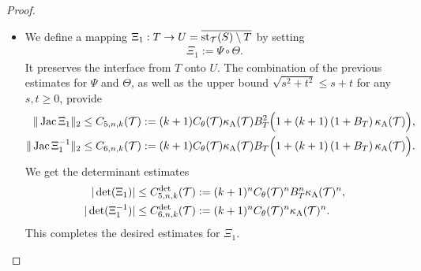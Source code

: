 \documentclass[10pt,a4paper]{article}
\begin{document}
\begin{proof}
\begin{itemize}
        
        
        
        \item 
        We define a mapping $ \Xi_{1} : T \rightarrow U = \overline{\operatorname{st}_{{\mathcal T}}(S) \setminus T}$ by setting 
        \begin{align*}
            \Xi_{1} := \Psi \circ \Theta.
        \end{align*}
        It preserves the interface from $T$ onto $U$. 
        The combination of the previous estimates for $\Psi$ and $\Theta$,
        as well as the upper bound $\sqrt{s^2+t^2} \leq s + t$ for any $s,t \geq 0$,
        provide 
        \begin{align*}
            \|  \operatorname{{\rm Jac}} \Xi_{1}  \|_{2}
            &\leq 
            C_{5,n,k}({\mathcal T})
            :=
            (k+1) 
            C_\theta({\mathcal T})
            \kappa_{\rm A}({\mathcal T})
            B_{T}^{2}
            \Big( 
                1 
                + 
                (k+1) 
                \left( 1 + B_{T} \right)
                \kappa_{\rm A}({\mathcal T})
            \Big)            
            ,
            \\
            \|  \operatorname{{\rm Jac}} \Xi_{1}^{-1}  \|_{2}
            &\leq  
            C_{6,n,k}({\mathcal T})
            :=
            (k+1) 
            C_\theta({\mathcal T})
            \kappa_{\rm A}({\mathcal T})
            B_{T}
            \Big( 
                1 
                + 
                (k+1) 
                \left( 1 + B_{T} \right)
                \kappa_{\rm A}({\mathcal T})
            \Big)            
            .
        \end{align*}
        We get the determinant estimates
        \begin{align*}
            |\det(\Xi_{1})|
            &\leq 
            C^{\det}_{5,n,k}({\mathcal T})
            :=
            (k+1)^{n}
            C_\theta({\mathcal T})^{n}
            B_{T}^{n}
            \kappa_{\rm A}({\mathcal T})^{n}
            ,
            \\
            |\det(\Xi_{1}^{-1})|
            &\leq 
            C^{\det}_{6,n,k}({\mathcal T})
            :=
            (k+1)^{n}
            C_\theta({\mathcal T})^{n}
            \kappa_{\rm A}({\mathcal T})^{n}
            .
        \end{align*}
        This completes the desired estimates for $\Xi_{1}$. 
        

\end{itemize}
\end{proof}
\end{document}
